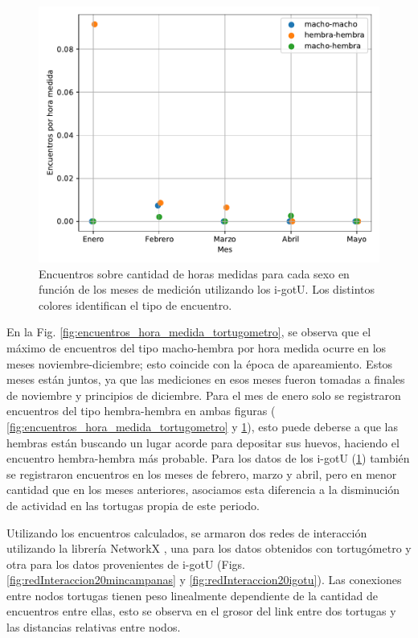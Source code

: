 \begin{figure}[ht]
    \begin{center}
       
   
    \includegraphics[width=\imsize]{Chap2/encuentros_por_hora_igotu.pdf}
\end{center}
    \caption[Encuentros por hora medida tomando los datos de los i-gotU.]{Encuentros sobre cantidad de horas medidas para cada sexo en función de los meses de medición utilizando los i-gotU. Los distintos colores identifican el tipo de encuentro.}
    \label{fig:encuentros_hora_medida_igotu}
\end{figure}
En la Fig. \ref{fig:encuentros_hora_medida_tortugometro}, se observa que el máximo de encuentros del tipo macho-hembra por hora medida ocurre en los meses noviembre-diciembre; esto coincide con la época de apareamiento. Estos meses están juntos, ya que las mediciones en esos meses fueron tomadas a finales de noviembre y principios de diciembre. Para el mes de enero solo se registraron encuentros del tipo hembra-hembra en ambas figuras ( \ref{fig:encuentros_hora_medida_tortugometro} y \ref{fig:encuentros_hora_medida_igotu}), esto puede deberse a que las hembras están buscando un lugar acorde para depositar sus huevos, haciendo el encuentro hembra-hembra más probable. Para los datos de los i-gotU (\ref{fig:encuentros_hora_medida_igotu}) también se registraron encuentros en los meses de febrero, marzo y abril, pero en menor cantidad que en los meses anteriores, asociamos esta diferencia a la disminución de actividad en las tortugas propia de este periodo.
 
 
Utilizando los encuentros calculados, se armaron dos redes de interacción  utilizando la librería NetworkX \cite{networkx}, una para los datos obtenidos con  tortugómetro y otra para los datos provenientes de i-gotU (Figs. \ref{fig:redInteraccion20mincampanas} y \ref{fig:redInteraccion20igotu}). Las conexiones entre nodos tortugas tienen peso linealmente dependiente de la cantidad de encuentros entre ellas, esto se observa en el grosor del link entre dos tortugas y las distancias relativas entre nodos.
 
